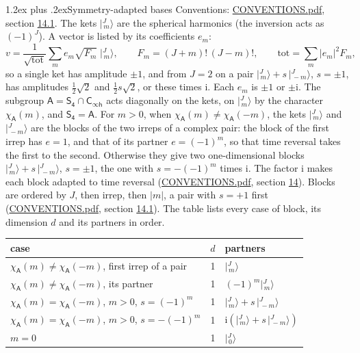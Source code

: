 \documentclass[10pt,a4paper]{article}
\makeatletter
\renewcommand\section{\@startsection{section}{1}{\z@}{-3ex plus -1ex minus -.2ex}%
  {1.2ex plus .2ex}{\normalfont\large\sffamily\bfseries\color{parttitle}}}
\numberwithin{equation}{section}
\newcommand{\grp}[1]{\mathsf{#1}}
\newcommand{\iunit}{\mathrm{i}}
\newcommand{\chiA}{\chi_{\grp{A}}}
\newcommand{\jm}[2]{\bigl\lvert{}^{#1}_{\,#2}\bigr\rangle}
\makeatother
\begin{document}
\section{Symmetry-adapted bases}\label{s:bases}
Conventions: \href{../../CONVENTIONS.pdf}{CONVENTIONS.pdf}, section \href{../../CONVENTIONS.pdf\#conv.14.1}{14.1}.
\leavevmode\label{n:index.m}\label{n:vector.ket}The kets $\jm{J}{m}$ are the spherical harmonics (the inversion acts as $(-1)^J$). \label{n:index.ketcoefficient}\label{n:vector.basis.symmetry}\label{n:index.ketweight}\label{n:index.total}A vector is listed by its coefficients $e_m$:
\begin{equation}\label{e:ket}v = \frac{1}{\sqrt{\mathrm{tot}}}\sum_m e_m\sqrt{F_m}\;\jm{J}{m},\qquad F_m = (J+m)!\,(J-m)!,\qquad \mathrm{tot} = \sum_m |e_m|^2F_m,\end{equation}
\leavevmode\label{n:index.pair.sign}so a single ket has amplitude $\pm1$, and from $J = 2$ on a pair $\jm{J}{m} + s\,\jm{J}{-m}$, $s = \pm1$, has amplitudes $\tfrac{1}{2}\sqrt{2}$ and $\tfrac{1}{2}s\sqrt{2}$, or these times $\iunit$. Each $e_m$ is $\pm1$ or $\pm\iunit$.
\leavevmode\label{n:group.A}\label{n:function.character.abelian}The subgroup $\grp{A} = \grp{S_{4}}\cap\grp{C_{\infty h}}$ acts diagonally on the kets, on $\jm{J}{m}$ by the character $\chiA(m)$, and $\grp{S_{4}} = \grp{A}$. For $m > 0$, when $\chiA(m) \ne \chiA(-m)$, the kets $\jm{J}{m}$ and $\jm{J}{-m}$ are the blocks of the two irreps of a complex pair: the block of the first irrep has $e = 1$, and that of its partner $e = (-1)^m$, so that time reversal takes the first to the second. Otherwise they give two one-dimensional blocks $\jm{J}{m} + s\,\jm{J}{-m}$, $s = \pm1$, the one with $s = -(-1)^m$ times $\iunit$. The factor $\iunit$ makes each block adapted to time reversal (\href{../../CONVENTIONS.pdf}{CONVENTIONS.pdf}, section \href{../../CONVENTIONS.pdf\#conv.14}{14}). Blocks are ordered by $J$, then irrep, then $|m|$, a pair with $s = +1$ first (\href{../../CONVENTIONS.pdf}{CONVENTIONS.pdf}, section \href{../../CONVENTIONS.pdf\#conv.14.1}{14.1}).
\leavevmode\label{n:head.case}\label{n:head.partners}The table lists every case of block, its dimension $d$ and its partners in order.
\begin{center}\begin{tabular}{@{}lrl@{}}\toprule
case & $d$ & partners\\\midrule
$\chiA(m) \ne \chiA(-m)$, first irrep of a pair & 1 & $\jm{J}{m}$\\
$\chiA(m) \ne \chiA(-m)$, its partner & 1 & $(-1)^m\jm{J}{m}$\\
$\chiA(m) = \chiA(-m)$, $m > 0$, $s = (-1)^m$ & 1 & $\jm{J}{m} + s\,\jm{J}{-m}$\\
$\chiA(m) = \chiA(-m)$, $m > 0$, $s = -(-1)^m$ & 1 & $\iunit(\jm{J}{m} + s\,\jm{J}{-m})$\\
$m = 0$ & 1 & $\jm{J}{0}$\\
\bottomrule\end{tabular}\end{center}
\end{document}
